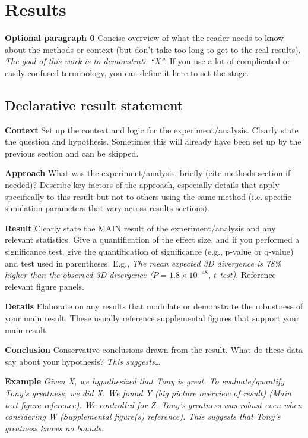

\section{Results}
\resultsTips %
\textbf{Optional paragraph 0} Concise overview of what the reader needs to know about the methods or context (but don’t take too long to get to the real results). \textit{The goal of this work is to demonstrate “X”}. If you use a lot of complicated or easily confused terminology, you can define it here to set the stage. 

\subsection{Declarative result statement}
\textbf{Context} Set up the context and logic for the experiment/analysis. Clearly state the question and hypothesis. Sometimes this will already have been set up by the previous section and can be skipped.

\noindent\textbf{Approach} What was the experiment/analysis, briefly (cite methods section if needed)? Describe key factors of the approach, especially details that apply specifically to this result but not to others using the same method (i.e. specific simulation parameters that vary across results sections).

\noindent\textbf{Result} Clearly state the MAIN result of the experiment/analysis and any relevant statistics. Give a quantification of the effect size, and if you performed a significance test, give the quantification of significance (e.g., p-value or q-value) and test used in parentheses. E.g., \textit{The mean expected 3D divergence is 78\% higher than the observed 3D divergence ($P = 1.8\times10^{-48}$, $t$-test)}. Reference relevant figure panels.

\noindent\textbf{Details} Elaborate on any results that modulate or demonstrate the robustness of your main result. These usually reference supplemental figures that support your main result.

\noindent\textbf{Conclusion} Conservative conclusions drawn from the result. What do these data say about your hypothesis? \textit{This suggests\dots} 

\textbf{Example} \textit{Given X, we hypothesized that Tony is great. To evaluate/quantify Tony’s greatness, we did X. We found Y (big picture overview of result) (Main text figure reference). We controlled for Z. Tony’s greatness was robust even when considering W (Supplemental figure(s) reference). This suggests that Tony's greatness knows no bounds.}

